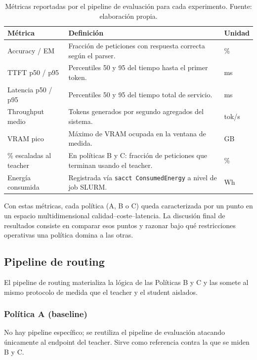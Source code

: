 \documentclass[11pt,a4paper]{article}
\begin{document}
\begin{table}[H]
\centering
\caption{Métricas reportadas por el pipeline de evaluación para cada experimento. Fuente: elaboración propia.}
\label{tab:metricas-reportadas}
\footnotesize
\begin{tabularx}{\textwidth}{>{\raggedright\arraybackslash}p{3.5cm} >{\raggedright\arraybackslash}X >{\raggedright\arraybackslash}p{3.2cm}}
\toprule
\textbf{Métrica} & \textbf{Definición} & \textbf{Unidad} \\
\midrule
Accuracy / EM & Fracción de peticiones con respuesta correcta según el parser. & \% \\
TTFT p50 / p95 & Percentiles 50 y 95 del tiempo hasta el primer token. & ms \\
Latencia p50 / p95 & Percentiles 50 y 95 del tiempo total de servicio. & ms \\
Throughput medio & Tokens generados por segundo agregados del sistema. & tok/s \\
VRAM pico & Máximo de VRAM ocupada en la ventana de medida. & GB \\
\% escaladas al teacher & En políticas B y C: fracción de peticiones que terminan usando el teacher. & \% \\
Energía consumida & Registrada vía \texttt{sacct ConsumedEnergy} a nivel de job SLURM. & Wh \\
\bottomrule
\end{tabularx}
\end{table}

Con estas métricas, cada política (A, B o C) queda caracterizada por un punto en un espacio multidimensional calidad--coste--latencia. La discusión final de resultados consiste en comparar esos puntos y razonar bajo qué restricciones operativas una política domina a las otras.

\subsection{Pipeline de routing}

El pipeline de routing materializa la lógica de las Políticas B y C y las somete al mismo protocolo de medida que el teacher y el student aislados.

\subsubsection{Política A (baseline)}

No hay pipeline específico; se reutiliza el pipeline de evaluación atacando únicamente al endpoint del teacher. Sirve como referencia contra la que se miden B y C.
\end{document}
